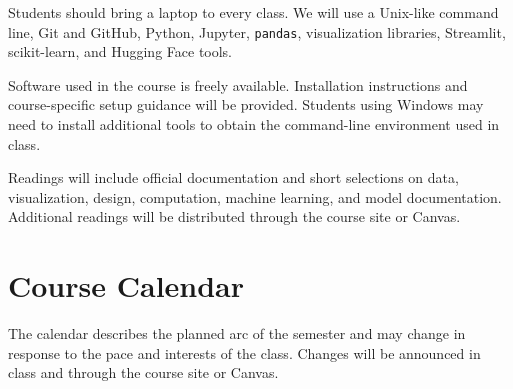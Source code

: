 \documentclass[11pt]{article}
\begin{document}
Students should bring a laptop to every class. We will use a Unix-like command
line, Git and GitHub, Python, Jupyter, \texttt{pandas}, visualization
libraries, Streamlit, scikit-learn, and Hugging Face tools.

Software used in the course is freely available. Installation instructions
and course-specific setup guidance will be provided. Students using Windows
may need to install additional tools to obtain the command-line environment
used in class.

Readings will include official documentation and short selections on data,
visualization, design, computation, machine learning, and model
documentation. Additional readings will be distributed through the course
site or Canvas.

\section{Course Calendar}

The calendar describes the planned arc of the semester and may change in
response to the pace and interests of the class. Changes will be announced in
class and through the course site or Canvas.
\end{document}
